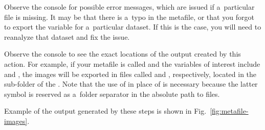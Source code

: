 \bul Observe the console for possible error messages, which are issued if a~particular file is missing. It may be that there is a~typo in the metafile, or that you forgot to export the variable for a~particular dataset. If this is the case, you will need to reanalyze that dataset and fix the issue.

\bul Observe the console to see the exact locations of the output created by this action. For example, if your metafile is called  and the variables of interest include  and , the images will be exported in files called  and , respectively, located in the sub-folder  of the . Note that the use of \ttt{-} in place of \ttt{/} is necessary because the latter symbol is reserved as a~folder separator in the absolute path to files.

\bul Example of the output generated by these steps is shown in Fig.~\ref{fig:metafile-images}.

